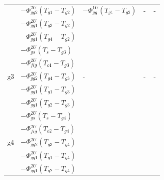 \begin{table}
\begin{tabular}{p{1cm}p{3cm}p{3cm}p{3cm}p{3cm}}
                       & $-\Phi_{gg2}^{2U}(T_{g1}-T_{g2})$ & $-\Phi_{gg}^{1U}(T_{g1}-T_{g2})$    &-&-\\
                       & $-\Phi_{gg1}^{2U}(T_{g3}-T_{g2})$ &                                     &~&~\\
                       & $-\Phi_{gg1}^{2U}(T_{g4}-T_{g2})$ &                                     &~&~\\
\hline
\multirow{5}{*}{g3}    & $-\Phi_{gs}^{2U}(T_{s}-T_{g3})$   &                                     &~&~\\
                       & $-\Phi_{fig}^{2U}(T_{o1}-T_{g3})$ &                                     &~&~\\
                       & $ -\Phi_{gg2}^{2U}(T_{g4}-T_{g3})$&-                                    &-&-\\
                       & $-\Phi_{gg1}^{2U}(T_{g1}-T_{g3})$ &                                     &~&~\\
                       & $-\Phi_{gg1}^{2U}(T_{g2}-T_{g3})$ &                                     &~&~\\
\hline
\multirow{5}{*}{g4}    & $-\Phi_{gs}^{2U}(T_{s}-T_{g4})$   &                                     &~&~\\
                       & $-\Phi_{fig}^{2U}(T_{o2}-T_{g4})$ &                                     &~&~\\
                       & $-\Phi_{gg2}^{2U}(T_{g3}-T_{g4})$ &-                                    &-&-\\
                       & $-\Phi_{gg1}^{2U}(T_{g1}-T_{g4})$ &                                     &~&~\\
                       & $-\Phi_{gg1}^{2U}(T_{g2}-T_{g4})$ &                                     &~&~\\
\hline \hline
\end{tabular}
\end{table}

